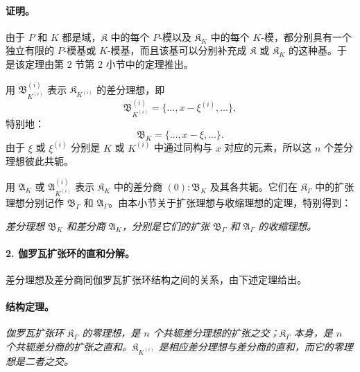 \documentclass[11pt]{article}
\begin{document}
\paragraph{证明。}
由于 $P$ 和 $K$ 都是域，$\mathfrak K$ 中的每个 $P$-模以及 $\mathfrak K_K$ 中的每个 $K$-模，都分别具有一个独立有限的 $P$-模基或 $K$-模基，而且该基可以分别补充成 $\mathfrak K$ 或 $\mathfrak K_K$ 的这种基。于是该定理由第 2 节第 2 小节中的定理推出。

用 $\mathfrak B_{K^{(i)}}^{(i)}$ 表示 $\mathfrak K_{K^{(i)}}$ 的差分理想，即
\[
\mathfrak B_{K^{(i)}}^{(i)}=\{\ldots,x-\xi^{(i)},\ldots\},
\]
特别地：
\[
\mathfrak B_K=\{\ldots,x-\xi,\ldots\}.
\]
由于 $\xi$ 或 $\xi^{(i)}$ 分别是 $K$ 或 $K^{(i)}$ 中通过同构与 $x$ 对应的元素，所以这 $n$ 个差分理想彼此共轭。

用 $\mathfrak A_K$ 或 $\mathfrak A_{K^{(i)}}^{(i)}$ 表示 $\mathfrak K_K$ 中的差分商 $(0):\mathfrak B_K$ 及其各共轭。它们在 $\mathfrak K_\Gamma$ 中的扩张理想分别记作 $\mathfrak B_\Gamma$ 和 $\mathfrak A_\Gamma$。由本小节关于扩张理想与收缩理想的定理，特别得到：

\emph{差分理想 $\mathfrak B_K$ 和差分商 $\mathfrak A_K$，分别是它们的扩张 $\mathfrak B_\Gamma$ 和 $\mathfrak A_\Gamma$ 的收缩理想。}

\paragraph{2. 伽罗瓦扩张环的直和分解。}
差分理想及差分商同伽罗瓦扩张环结构之间的关系，由下述定理给出。

\paragraph{结构定理。}
\emph{伽罗瓦扩张环 $\mathfrak K_\Gamma$ 的零理想，是 $n$ 个共轭差分理想的扩张之交；$\mathfrak K_\Gamma$ 本身，是 $n$ 个共轭差分商的扩张之直和。$\mathfrak K_{K^{(i)}}$ 是相应差分理想与差分商的直和，而它的零理想是二者之交。}
\end{document}
